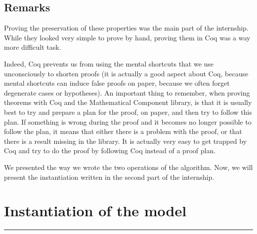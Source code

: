 \documentclass[a4paper,10pt]{article}
\begin{document}
\subsection{Remarks}

Proving the preservation of these properties was the main part of the internship. While they looked very simple to prove by hand, proving them in {\sc Coq} was a way more difficult task.

Indeed, {\sc Coq} prevents us from using the mental shortcuts that we use unconsciously to shorten proofs (it is actually a good aspect about {\sc Coq}, because mental shortcuts can induce false proofs on paper, because we often forget degenerate cases or hypotheses). An important thing to remember, when proving theorems with {\sc Coq} and the {\sc Mathematical Component} library, is that it is usually best to try and prepare a plan for the proof, on paper, and then try to follow this plan.  If something is wrong during the proof and it becomes no longer possible to follow the plan, it means that either there is a problem with the proof, or that there is a result missing in the library. It is actually very easy to get trapped by {\sc Coq} and try to do the proof by following {\sc Coq} instead of a proof plan.

We presented the way we wrote the two operations of the algorithm. Now, we will present the instantiation written in the second part of the internship.

\section{Instantiation of the model}
\rule{\linewidth}{0.5pt}
\label{implementation}
\end{document}
